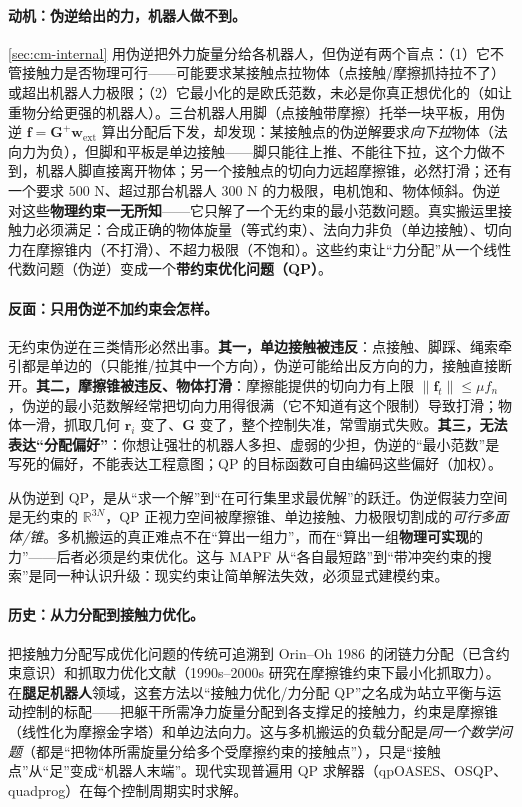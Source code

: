 \paragraph{动机：伪逆给出的力，机器人做不到。}
\cref{sec:cm-internal} 用伪逆把外力旋量分给各机器人，但伪逆有两个盲点：（1）它不管接触力是否物理可行——可能要求某接触点拉物体（点接触/摩擦抓持拉不了）或超出机器人力极限；（2）它最小化的是欧氏范数，未必是你真正想优化的（如让重物分给更强的机器人）。三台机器人用脚（点接触带摩擦）托举一块平板，用伪逆 $\mathbf{f}=\mathbf{G}^{+}\mathbf{w}_{\text{ext}}$ 算出分配后下发，却发现：某接触点的伪逆解要求\emph{向下拉}物体（法向力为负），但脚和平板是单边接触——脚只能往上推、不能往下拉，这个力做不到，机器人脚直接离开物体；另一个接触点的切向力远超摩擦锥，必然打滑；还有一个要求 $500$ N、超过那台机器人 $300$ N 的力极限，电机饱和、物体倾斜。伪逆对这些\textbf{物理约束一无所知}——它只解了一个无约束的最小范数问题。真实搬运里接触力必须满足：合成正确的物体旋量（等式约束）、法向力非负（单边接触）、切向力在摩擦锥内（不打滑）、不超力极限（不饱和）。这些约束让“力分配”从一个线性代数问题（伪逆）变成一个\textbf{带约束优化问题（QP）}。

\paragraph{反面：只用伪逆不加约束会怎样。}
无约束伪逆在三类情形必然出事。\textbf{其一，单边接触被违反}：点接触、脚踩、绳索牵引都是单边的（只能推/拉其中一个方向），伪逆可能给出反方向的力，接触直接断开。\textbf{其二，摩擦锥被违反、物体打滑}：摩擦能提供的切向力有上限 $\|\mathbf{f}_t\|\le\mu f_n$，伪逆的最小范数解经常把切向力用得很满（它不知道有这个限制）导致打滑；物体一滑，抓取几何 $\mathbf{r}_i$ 变了、$\mathbf{G}$ 变了，整个控制失准，常雪崩式失败。\textbf{其三，无法表达“分配偏好”}：你想让强壮的机器人多担、虚弱的少担，伪逆的“最小范数”是写死的偏好，不能表达工程意图；QP 的目标函数可自由编码这些偏好（加权）。

\begin{insight}
从伪逆到 QP，是从“求一个解”到“在可行集里求最优解”的跃迁。伪逆假装力空间是无约束的 $\mathbb{R}^{3N}$，QP 正视力空间被摩擦锥、单边接触、力极限切割成的\emph{可行多面体/锥}。多机搬运的真正难点不在“算出一组力”，而在“算出一组\textbf{物理可实现}的力”——后者必须是约束优化。这与 MAPF 从“各自最短路”到“带冲突约束的搜索”是同一种认识升级：现实约束让简单解法失效，必须显式建模约束。
\end{insight}

\paragraph{历史：从力分配到接触力优化。}
把接触力分配写成优化问题的传统可追溯到 Orin--Oh 1986\cite{orin1986force} 的闭链力分配（已含约束意识）和抓取力优化文献（1990s--2000s 研究在摩擦锥约束下最小化抓取力）。在\textbf{腿足机器人}领域，这套方法以“接触力优化/力分配 QP”之名成为站立平衡与运动控制的标配——把躯干所需净力旋量分配到各支撑足的接触力，约束是摩擦锥（线性化为摩擦金字塔）和单边法向力。这与多机搬运的负载分配是\emph{同一个数学问题}（都是“把物体所需旋量分给多个受摩擦约束的接触点”），只是“接触点”从“足”变成“机器人末端”。现代实现普遍用 QP 求解器（qpOASES、OSQP、quadprog）在每个控制周期实时求解。

